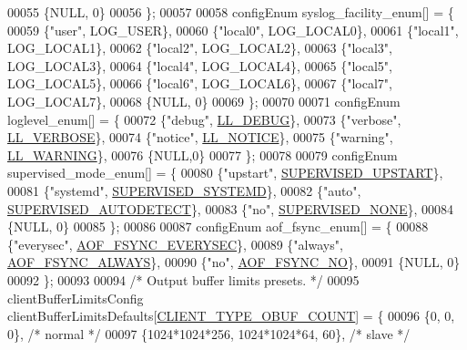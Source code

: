 \begin{DoxyCode}
00055     \{NULL, 0\}
00056 \};
00057 
00058 configEnum syslog\_facility\_enum[] = \{
00059     \{\textcolor{stringliteral}{"user"},    LOG\_USER\},
00060     \{\textcolor{stringliteral}{"local0"},  LOG\_LOCAL0\},
00061     \{\textcolor{stringliteral}{"local1"},  LOG\_LOCAL1\},
00062     \{\textcolor{stringliteral}{"local2"},  LOG\_LOCAL2\},
00063     \{\textcolor{stringliteral}{"local3"},  LOG\_LOCAL3\},
00064     \{\textcolor{stringliteral}{"local4"},  LOG\_LOCAL4\},
00065     \{\textcolor{stringliteral}{"local5"},  LOG\_LOCAL5\},
00066     \{\textcolor{stringliteral}{"local6"},  LOG\_LOCAL6\},
00067     \{\textcolor{stringliteral}{"local7"},  LOG\_LOCAL7\},
00068     \{NULL, 0\}
00069 \};
00070 
00071 configEnum loglevel\_enum[] = \{
00072     \{\textcolor{stringliteral}{"debug"}, \hyperlink{server_8h_abcaffe365dee628fcf9fc90c69d534a1}{LL\_DEBUG}\},
00073     \{\textcolor{stringliteral}{"verbose"}, \hyperlink{server_8h_a479b60032f8da6d8ad72e1a9d0809950}{LL\_VERBOSE}\},
00074     \{\textcolor{stringliteral}{"notice"}, \hyperlink{server_8h_a8c54c191e436c7dd3012167212692401}{LL\_NOTICE}\},
00075     \{\textcolor{stringliteral}{"warning"}, \hyperlink{server_8h_a31229b9334bba7d6be2a72970967a14b}{LL\_WARNING}\},
00076     \{NULL,0\}
00077 \};
00078 
00079 configEnum supervised\_mode\_enum[] = \{
00080     \{\textcolor{stringliteral}{"upstart"}, \hyperlink{server_8h_ae34bdafb8c6d3cc58fc6b319e623b604}{SUPERVISED\_UPSTART}\},
00081     \{\textcolor{stringliteral}{"systemd"}, \hyperlink{server_8h_aea7b4966d78f67f5ab89f38f0e1bde74}{SUPERVISED\_SYSTEMD}\},
00082     \{\textcolor{stringliteral}{"auto"}, \hyperlink{server_8h_a7b2b1d1fd04a4f2c1a141e0976dd479b}{SUPERVISED\_AUTODETECT}\},
00083     \{\textcolor{stringliteral}{"no"}, \hyperlink{server_8h_a2a0d6ba64b419357e52a6473f48bc882}{SUPERVISED\_NONE}\},
00084     \{NULL, 0\}
00085 \};
00086 
00087 configEnum aof\_fsync\_enum[] = \{
00088     \{\textcolor{stringliteral}{"everysec"}, \hyperlink{server_8h_a9784233b87ec796d0343556106fb778e}{AOF\_FSYNC\_EVERYSEC}\},
00089     \{\textcolor{stringliteral}{"always"}, \hyperlink{server_8h_a83bfec10b7b4be60ec6d5868cadc73bb}{AOF\_FSYNC\_ALWAYS}\},
00090     \{\textcolor{stringliteral}{"no"}, \hyperlink{server_8h_ae5ee4e99d817a4921da225edcd36a8a9}{AOF\_FSYNC\_NO}\},
00091     \{NULL, 0\}
00092 \};
00093 
00094 \textcolor{comment}{/* Output buffer limits presets. */}
00095 clientBufferLimitsConfig clientBufferLimitsDefaults[\hyperlink{server_8h_aea8f6f3fac3a68e35807eba109dbc501}{CLIENT\_TYPE\_OBUF\_COUNT}] = \{
00096     \{0, 0, 0\}, \textcolor{comment}{/* normal */}
00097     \{1024*1024*256, 1024*1024*64, 60\}, \textcolor{comment}{/* slave */}

\end{DoxyCode}
